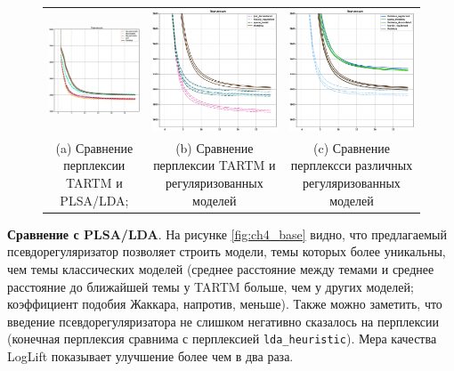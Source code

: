 \begin{figure}
\begin{tabular}{ccc}
    \includegraphics[width=55mm]{images/CH4_baselines_PerplexityScore.eps} &   \includegraphics[width=55mm]{images/CH4_vs_regularized_PerplexityScore.eps} & \includegraphics[width=55mm]{images/CH4_improved_PerplexityScore.eps} \\
    (a) Сравнение перплексии TARTM и PLSA/LDA; & (b) Сравнение перплексии TARTM и регуляризованных моделей & (c) Сравнение перплексси различных регуляризованных моделей \\[6pt]
\end{tabular}
\label{fig:Perple3x}
\end{figure}

\textbf{Сравнение с PLSA/LDA}. На рисунке \ref{fig:ch4_base} видно, что предлагаемый псевдорегуляризатор позволяет строить модели, темы которых более уникальны, чем темы классических моделей (среднее расстояние между темами и среднее расстояние до ближайшей темы у TARTM больше, чем у других моделей; коэффициент подобия Жаккара, напротив, меньше). Также можно заметить, что введение псевдорегуляризатора не слишком негативно сказалось на перплексии (конечная перплексия сравнима с перплексией \texttt{lda\_heuristic}). Мера качества LogLift показывает улучшение более чем в два раза.


